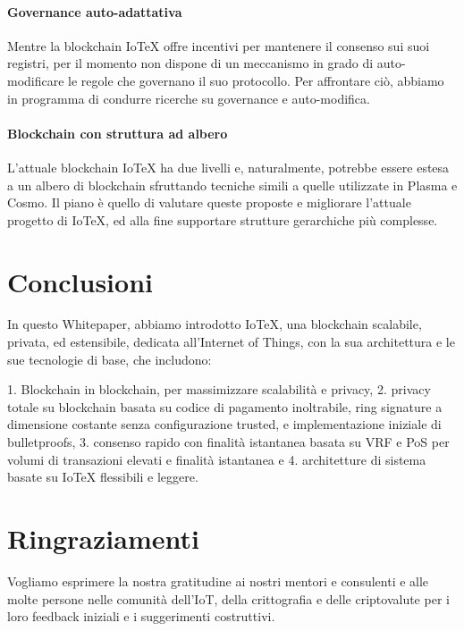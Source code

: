 \paragraph{Governance auto-adattativa}
Mentre la blockchain IoTeX offre incentivi per mantenere il consenso sui suoi registri, per il momento non dispone di un meccanismo in grado di auto-modificare le regole che governano il suo protocollo. Per affrontare ciò, abbiamo in programma di condurre ricerche su governance e auto-modifica.

\paragraph{Blockchain con struttura ad albero}
L'attuale blockchain IoTeX ha due livelli e, naturalmente, potrebbe essere estesa a un albero di blockchain sfruttando tecniche simili a quelle utilizzate in Plasma e Cosmo. Il piano è quello di valutare queste proposte e migliorare l'attuale progetto di IoTeX, ed alla fine supportare strutture gerarchiche più complesse.

\section{Conclusioni}
In questo Whitepaper, abbiamo introdotto IoTeX, una blockchain scalabile, privata, ed estensibile, dedicata all'Internet of Things, con la sua architettura e le sue tecnologie di base, che includono:

1. Blockchain in blockchain, per massimizzare scalabilità e privacy, 2. privacy totale su blockchain basata su codice di pagamento inoltrabile, ring signature a dimensione costante senza configurazione trusted, e implementazione iniziale di bulletproofs, 3. consenso rapido con finalità istantanea basata su VRF e PoS per volumi di transazioni elevati e finalità istantanea e 4. architetture di sistema basate su IoTeX flessibili e leggere.

\section{Ringraziamenti}
Vogliamo esprimere la nostra gratitudine ai nostri mentori e consulenti e alle molte persone nelle comunità dell'IoT, della crittografia e delle criptovalute per i loro feedback iniziali e i suggerimenti costruttivi.
